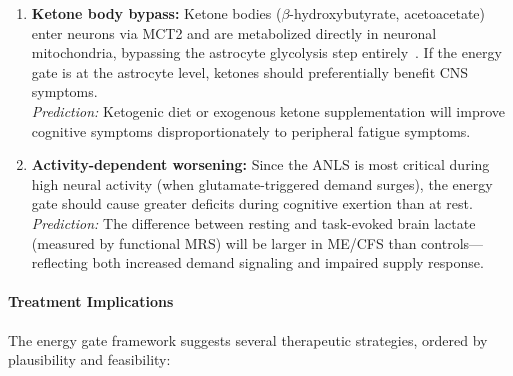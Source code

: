 \begin{enumerate}
    \item \textbf{Ketone body bypass:} Ketone bodies ($\beta$-hydroxybutyrate, acetoacetate) enter neurons via MCT2 and are metabolized directly in neuronal mitochondria, bypassing the astrocyte glycolysis step entirely~\cite{Jang2024Ketone}. If the energy gate is at the astrocyte level, ketones should preferentially benefit CNS symptoms. \\
    \emph{Prediction:} Ketogenic diet or exogenous ketone supplementation will improve cognitive symptoms disproportionately to peripheral fatigue symptoms.

    \item \textbf{Activity-dependent worsening:} Since the ANLS is most critical during high neural activity (when glutamate-triggered demand surges), the energy gate should cause greater deficits during cognitive exertion than at rest. \\
    \emph{Prediction:} The difference between resting and task-evoked brain lactate (measured by functional MRS) will be larger in ME/CFS than controls---reflecting both increased demand signaling and impaired supply response.
\end{enumerate}

\paragraph{Treatment Implications}

The energy gate framework suggests several therapeutic strategies, ordered by plausibility and feasibility:

